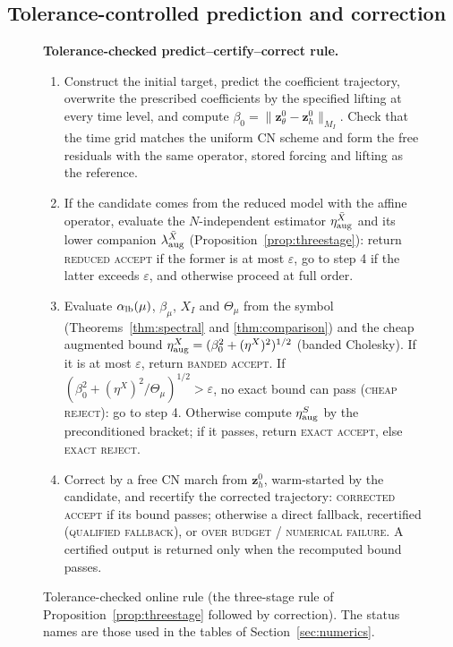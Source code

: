 \documentclass[hidelinks]{siamart251216}
\newcommand{\zz}{\mathbf z}
\newcommand{\Thmu}{\Theta_\mu}
\begin{document}
\subsection{Tolerance-controlled prediction and correction}
\label{ssec:algorithm}\label{ssec:two-stage}\label{ssec:correction}
\begin{figure}[!htbp]
\centering
\begin{minipage}{0.96\linewidth}\footnotesize
\textbf{Tolerance-checked predict--certify--correct rule.}
\begin{enumerate}[leftmargin=2em,itemsep=1pt]
\item Construct the initial target, predict the coefficient trajectory, overwrite the prescribed
coefficients by the specified lifting at every time level, and compute
$\beta_0=\|\zz_\theta^0-\zz_h^0\|_{M_I}$.  Check that the time grid matches the uniform CN scheme
and form the free residuals with the same operator, stored forcing and lifting as the reference.
\item If the candidate comes from the reduced model with the affine operator, evaluate the
$N$-independent estimator $\eta^{\bar X}_{\rm aug}$ and its lower companion $\lambda^{\bar X}_{\rm aug}$
(Proposition~\ref{prop:threestage}): return \textsc{reduced accept} if the former is at most
$\varepsilon$, go to step 4 if the latter exceeds $\varepsilon$, and otherwise proceed at full order.
\item Evaluate $\alpha_{\rm lb}(\mu)$, $\beta_\mu$, $X_I$ and $\Thmu$ from the symbol
(Theorems~\ref{thm:spectral} and \ref{thm:comparison}) and the cheap augmented bound
$\eta^X_{\rm aug}=(\beta_0^2+(\eta^X)^2)^{1/2}$ (banded Cholesky).  If it is at most $\varepsilon$,
return \textsc{banded accept}.  If $(\beta_0^2+(\eta^X)^2/\Thmu)^{1/2}>\varepsilon$, no exact bound
can pass (\textsc{cheap reject}): go to step 4.  Otherwise compute $\eta^S_{\rm aug}$ by the
preconditioned bracket; if it passes, return \textsc{exact accept}, else \textsc{exact reject}.
\item Correct by a free CN march from $\zz_h^0$, warm-started by the candidate, and recertify the
corrected trajectory: \textsc{corrected accept} if its bound passes; otherwise a direct fallback,
recertified (\textsc{qualified fallback}), or \textsc{over budget} / \textsc{numerical failure}.  A
certified output is returned only when the recomputed bound passes.
\end{enumerate}
\end{minipage}
\caption{Tolerance-checked online rule (the three-stage rule of Proposition~\ref{prop:threestage}
followed by correction). The status names are those used in the tables of Section~\ref{sec:numerics}.}
\label{alg:pcc}
\end{figure}
\end{document}

